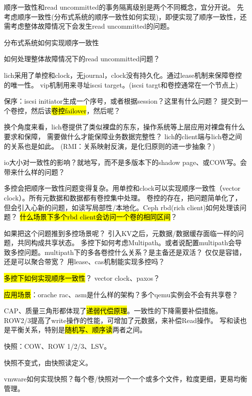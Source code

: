 顺序一致性和read uncommitted的事务隔离级别是两个不同概念，宜分开说。
先考虑顺序一致性(分布式系统的顺序一致性如何实现)，即便实现了顺序一致性，还需考虑整体故障情况下会发生read uncommitted的问题。
\begin{enumbox}
\item 分布式系统如何实现顺序一致性
\item 如何处理整体故障情况下的read uncommitted问题？
\end{enumbox}

lich采用了单控和clock，无journal，clock没有持久化。通过lease机制来保障卷控的唯一性。
vip机制用来寻址iscsi target。(iscsi targt和卷控通常在一个节点上)

保序：iscsi initiator生成一个序号，或者根据session？这里有什么问题？
提交到一个卷控，然后该\hl{卷控failover}，然后呢？

换个角度来看，lich卷提供了类似裸盘的东东，操作系统等上层应用对裸盘有什么要求和保障，
需要做什么才能保障业务数据完整性？ lich的client端与lich卷之间的关系也是如此。
(RMI：关系映射反演，是化归原则的进一步抽象？)

io大小对一致性的影响？就地写，而不是多版本下的shadow page、或COW写。会带来什么样的问题？

多控会把顺序一致性问题变得复杂。用单控和clock可以实现顺序一致性（vector clock）。所有元数据和数据都有卷控集中处理。
卷控的存在，把问题简单化了，但会引入心新的问题，如读写局部性/本地化。Ceph rbd(rich client)如何处理该问题？
\hl{什么场景下多个rbd client会访问一个卷的相同区间}？

如果把这个问题推到多控场景呢？ 引入KV之后，元数据/数据缓存面临一样的问题，共同构成共享状态。
多控下如何考虑Multipath。或者说配置multipath会导致多控问题。multipath下的多各卷控什么关系？是主备还是双活？
仅仅是容错，还是可以聚合带宽？ 用lease、cas机制能实现多控吗？

\hl{多控下如何实现顺序一致性}？ vector clock、paxos？

\hl{应用场景}：orache rac、asm是什么样的架构？多个qemu实例会不会有共享卷？

CAP、质量三角形都体现了\hl{递弱代偿原理}。一致性的下降需要补偿措施。
ROW2/3提高了write操作的性能，可增加了元数据，来补偿Read操作。
写和读也是平衡关系，特别是\hl{随机写、顺序读}两者之间。

\hrulefill

快照：COW、ROW 1/2/3、LSV。

快照不变式，由快照读定义。

vmware如何实现快照？每个卷/快照对一个一个或多个文件，粒度更细，更易均衡管理。

